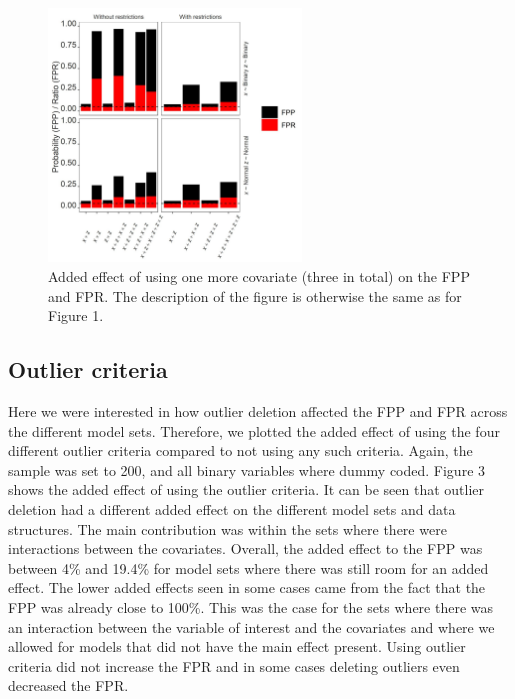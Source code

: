 \begin{figure}[t]
\includegraphics[width=0.6\textwidth]{R/Analysis/Result/Figures/Figure1C.jpeg}
\centering
\caption{Added effect of using one more covariate (three in total) on the FPP and FPR. The description of the figure is otherwise the same as for Figure 1.}
\label{fig:mainfigure}
\end{figure}

\subsection{Outlier criteria}
Here we were interested in how outlier deletion affected the FPP and FPR across the different model sets. Therefore, we plotted the added effect of using the four different outlier criteria compared to not using any such criteria. Again, the sample was set to 200, and all binary variables where dummy coded. Figure 3 shows the added effect of using the outlier criteria. It can be seen that outlier deletion had a different added effect on the different model sets and data structures. The main contribution was within the sets where there were interactions between the covariates. Overall, the added effect to the FPP was between 4\% and 19.4\% for model sets where there was still room for an added effect. The lower added effects seen in some cases came from the fact that the FPP was already close to 100\%. This was the case for the sets where there was an interaction between the variable of interest and the covariates and where we allowed for models that did not have the main effect present. Using outlier criteria did not increase the FPR and in some cases deleting outliers even decreased the FPR. 

